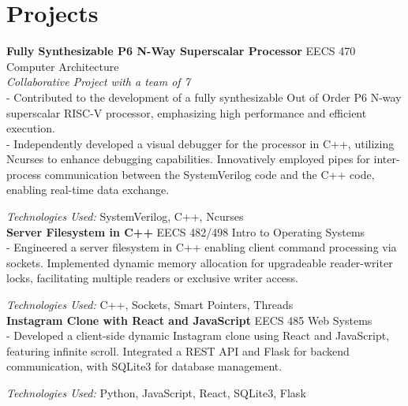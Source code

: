 \documentclass[letterpaper,11pt]{article}
\begin{document}
\section*{Projects}
\textbf{Fully Synthesizable P6 N-Way Superscalar Processor} \hfill EECS 470 Computer Architecture \\
\textit{Collaborative Project with a team of 7} \\
- Contributed to the development of a fully synthesizable Out of Order P6 N-way superscalar RISC-V processor, emphasizing high performance and efficient execution. \\
- Independently developed a visual debugger for the processor in C++,
utilizing Ncurses to enhance debugging capabilities.
Innovatively employed pipes for inter-process communication between the SystemVerilog code
and the C++ code, enabling real-time data exchange.

\textit{Technologies Used:} SystemVerilog, C++, Ncurses \\

\noindent \textbf{Server Filesystem in C++} \hfill EECS 482/498 Intro to Operating Systems \\
- Engineered a server filesystem in C++ enabling client command processing via sockets.
Implemented dynamic memory allocation for upgradeable reader-writer locks,
facilitating multiple readers or exclusive writer access.

\textit{Technologies Used:} C++, Sockets, Smart Pointers, Threads \\


\noindent \textbf{Instagram Clone with React and JavaScript} \hfill EECS 485 Web Systems \\
- Developed a client-side dynamic Instagram clone using React and JavaScript,
featuring infinite scroll. Integrated a REST API and Flask for backend communication,
with SQLite3 for database management.

\textit{Technologies Used:} Python, JavaScript, React, SQLite3, Flask
\end{document}

